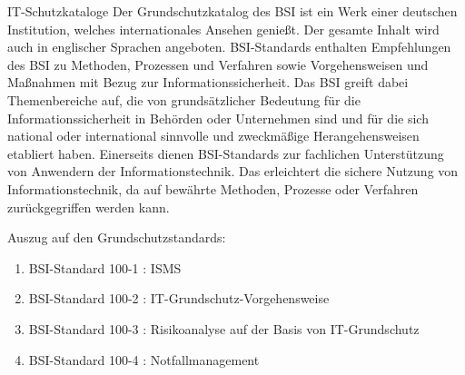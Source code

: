  \label{IT-Schutzkataloge}
 \begin{section}{IT-Schutzkataloge}
	Der Grundschutzkatalog des BSI ist ein Werk einer deutschen Institution, welches 
	internationales Ansehen genießt. Der gesamte Inhalt wird auch in englischer Sprachen 
	angeboten.
	BSI-Standards enthalten Empfehlungen des BSI zu Methoden, Prozessen und Verfahren sowie Vorgehensweisen 
	und Maßnahmen mit Bezug zur Informationssicherheit. 
	Das BSI greift dabei Themenbereiche auf, die von grundsätzlicher Bedeutung für die 
	Informationssicherheit in Behörden oder Unternehmen sind und für die sich national oder 
	international sinnvolle und zweckmäßige Herangehensweisen etabliert haben.
	Einerseits dienen BSI-Standards zur fachlichen Unterstützung von Anwendern der Informationstechnik. 
	Das erleichtert die sichere Nutzung von Informationstechnik, da auf bewährte Methoden, Prozesse 
	oder Verfahren zurückgegriffen werden kann.
  \cite{BSIITkat}  
  \DIFdelbegin %

\DIFdelend %
  Auszug auf den Grundschutzstandards:
  \begin{enumerate}
	\item BSI-Standard 100-1 \DIFaddbegin \cite{BSIGSStd}\DIFaddend : \ac{ISMS} \\
		\DIFaddbegin {}\DIFaddend \item BSI-Standard 100-2 \DIFaddbegin \cite{BSIGSStd}\DIFaddend : IT-Grundschutz-Vorgehensweise \\
		\DIFaddbegin {}\DIFaddend \item BSI-Standard 100-3 \DIFaddbegin \cite{BSIGSStd}\DIFaddend : Risikoanalyse auf der Basis von IT-Grundschutz \\
		\DIFaddbegin {}\DIFaddend \item BSI-Standard 100-4 \DIFaddbegin \cite{BSIGSStd}\DIFaddend : Notfallmanagement \\
		\DIFaddbegin {}\DIFaddend \end{enumerate}
 \end{section}

